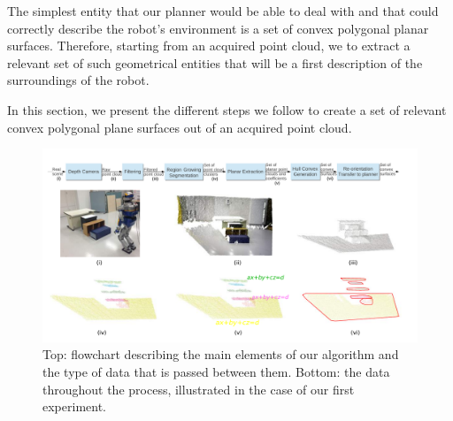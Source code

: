 The simplest entity that our planner would be able to deal with and that could correctly describe the robot's environment is a set of convex polygonal planar surfaces.
Therefore, starting from an acquired point cloud, we to extract a relevant set of such geometrical entities that will be a first description of the surroundings of the robot.

In this section, we present the different steps we follow to create a set of relevant convex polygonal plane surfaces out of an acquired point cloud.

\begin{figure}
\centering
  \includegraphics[width=\linewidth]{complete_pipeline.pdf}
  \caption{Top: flowchart describing the main elements of our algorithm and the type of data that is passed between them.\newline
  \hspace*{27pt} Bottom: the data throughout the process, illustrated in the case of our first experiment.}
\label{fig:full_pipeline}
\end{figure}


